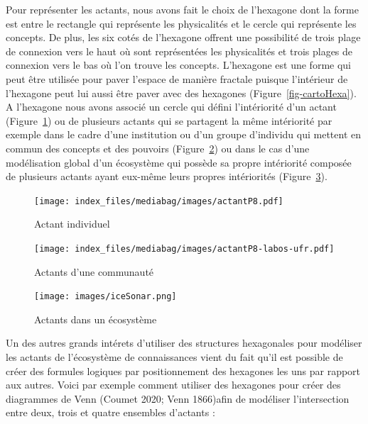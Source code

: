 \documentclass[
  letterpaper,
  DIV=11,
  numbers=noendperiod]{scrreprt}
\begin{document}
Pour représenter les actants, nous avons fait le choix de l'hexagone
dont la forme est entre le rectangle qui représente les physicalités et
le cercle qui représente les concepts. De plus, les six cotés de
l'hexagone offrent une possibilité de trois plage de connexion vers le
haut où sont représentées les physicalités et trois plages de connexion
vers le bas où l'on trouve les concepts. L'hexagone est une forme qui
peut être utilisée pour paver l'espace de manière fractale puisque
l'intérieur de l'hexagone peut lui aussi être paver avec des hexagones
(Figure~\ref{fig-cartoHexa}). A l'hexagone nous avons associé un cercle
qui défini l'intériorité d'un actant (Figure~\ref{fig-actantP8}) ou de
plusieurs actants qui se partagent la même intériorité par exemple dans
le cadre d'une institution ou d'un groupe d'individu qui mettent en
commun des concepts et des pouvoirs (Figure~\ref{fig-actantP8-membres})
ou dans le cas d'une modélisation global d'un écosystème qui possède sa
propre intériorité composée de plusieurs actants ayant eux-même leurs
propres intériorités (Figure~\ref{fig-actantSonar}).

\begin{figure}

{\centering \texttt{[image: index\_files/mediabag/images/actantP8.pdf]}

}

\caption{\label{fig-actantP8}Actant individuel}

\end{figure}

\begin{figure}

{\centering \texttt{[image: index\_files/mediabag/images/actantP8-labos-ufr.pdf]}

}

\caption{\label{fig-actantP8-membres}Actants d'une communauté}

\end{figure}

\begin{figure}

{\centering \texttt{[image: images/iceSonar.png]}

}

\caption{\label{fig-actantSonar}Actants dans un écosystème}

\end{figure}

Un des autres grands intérets d'utiliser des structures hexagonales pour
modéliser les actants de l'écosystème de connaissances vient du fait
qu'il est possible de créer des formules logiques par positionnement des
hexagones les uns par rapport aux autres. Voici par exemple comment
utiliser des hexagones pour créer des diagrammes de Venn (Coumet 2020;
Venn 1866)afin de modéliser l'intersection entre deux, trois et quatre
ensembles d'actants :
\end{document}
